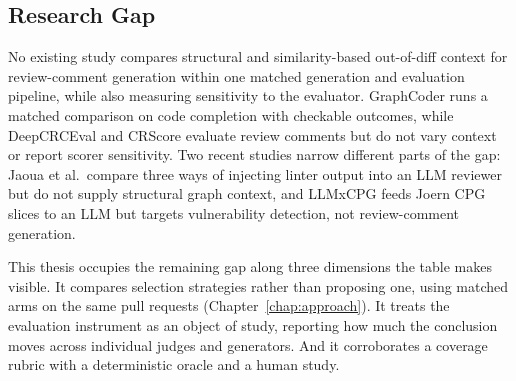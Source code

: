 \subsection*{Research Gap}

No existing study compares structural and similarity-based out-of-diff context
for review-comment generation within one matched generation and evaluation
pipeline, while also measuring sensitivity to the evaluator. GraphCoder runs a
matched comparison on code completion with checkable outcomes, while
DeepCRCEval and CRScore evaluate review comments but do not vary context or
report scorer sensitivity. Two recent studies narrow different parts of the
gap: Jaoua et al.\ compare three ways of injecting linter output into an LLM
reviewer but do not supply structural graph context, and LLMxCPG feeds Joern
CPG slices to an LLM but targets vulnerability detection, not review-comment
generation.

This thesis occupies the remaining gap along three dimensions the table makes
visible. It compares selection strategies rather than proposing one, using
matched arms on the same pull requests (Chapter~\ref{chap:approach}). It
treats the evaluation instrument as an object of study, reporting how much the
conclusion moves across individual judges and generators. And it corroborates
a coverage rubric with a deterministic oracle and a human study.
